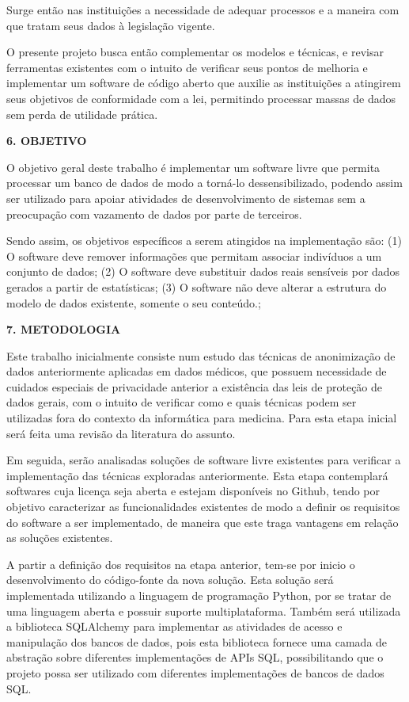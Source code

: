 \documentclass[a4paper,12pt,oneside,openany]{report}
\begin{document}
Surge então nas instituições a necessidade de adequar processos e a maneira com que tratam seus dados à legislação vigente.

O presente projeto busca então complementar os modelos e técnicas, e revisar ferramentas existentes com o intuito de verificar seus pontos de melhoria e implementar um software de código aberto que auxilie as instituições a atingirem seus objetivos de conformidade com a lei, permitindo processar massas de dados sem perda de utilidade prática.

\vspace{0.4cm}
\textbf{6. OBJETIVO}

O objetivo geral deste trabalho é implementar um software livre que permita processar um banco de dados de modo a torná-lo dessensibilizado, podendo assim ser utilizado para apoiar atividades de desenvolvimento de sistemas sem a preocupação com vazamento de dados por parte de terceiros.

Sendo assim, os objetivos específicos a serem atingidos na implementação são: (1) O software deve remover informações que permitam associar indivíduos a um conjunto de dados; (2) O software deve substituir dados reais sensíveis por dados gerados a partir de estatísticas; (3) O software não deve alterar a estrutura do modelo de dados existente, somente o seu conteúdo.;

\vspace{0.4cm}
\textbf{7. METODOLOGIA}

Este trabalho inicialmente consiste num estudo das técnicas de anonimização de dados anteriormente aplicadas em dados médicos, que possuem necessidade de cuidados especiais de privacidade anterior a existência das leis de proteção de dados gerais, com o intuito de verificar como e quais técnicas podem ser utilizadas fora do contexto da informática para medicina. Para esta etapa inicial será feita uma revisão da literatura do assunto.

Em seguida, serão analisadas soluções de software livre existentes para verificar a implementação das técnicas exploradas anteriormente. Esta etapa contemplará softwares cuja licença seja aberta e estejam disponíveis no Github, tendo por objetivo caracterizar as funcionalidades existentes de modo a definir os requisitos do software a ser implementado, de maneira que este traga vantagens em relação as soluções existentes.

A partir a definição dos requisitos na etapa anterior, tem-se por inicio o desenvolvimento do código-fonte da nova solução. Esta solução será implementada utilizando a linguagem de programação Python, por se tratar de uma linguagem aberta e possuir suporte multiplataforma. Também será utilizada a biblioteca SQLAlchemy para implementar as atividades de acesso e manipulação dos bancos de dados, pois esta biblioteca fornece uma camada de abstração sobre diferentes implementações de APIs SQL\cite{sqlalch}, possibilitando que o projeto possa ser utilizado com diferentes implementações de bancos de dados SQL.
\end{document}
